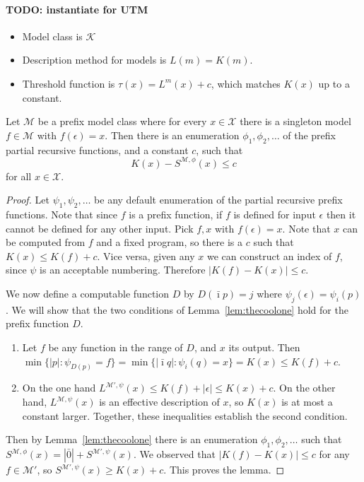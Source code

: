 \documentclass{style/llncs}
\newcommand{\M}{\mathcal M}
\newcommand{\K}{\mathcal K}
\newcommand{\X}{\mathcal X}
\begin{document}
\paragraph{TODO: instantiate for UTM}

\begin{itemize}
\item Model class is $\K$
\item Description method for models is $L(m)=K(m)$.
\item Threshold function is $\tau(x)=L^m(x)+c$, which matches $K(x)$
  up to a constant.
\end{itemize}


\begin{lemma}
Let $\M$ be a prefix model class where for every $x\in\X$ there is a singleton model $f\in\M$ with $f(\epsilon)=x$. Then there is an enumeration $\phi_1,\phi_2,\ldots$ of the prefix partial recursive functions, and a constant $c$, such that
\[
K(x)-S^{\M,\phi}(x)\le c
\]
for all $x\in\X$.
\end{lemma}
\begin{proof}
Let $\psi_1,\psi_2,\ldots$ be any default enumeration of the partial recursive prefix functions. Note that since $f$ is a prefix function, if $f$ is defined for input $\epsilon$ then it cannot be defined for any other input. Pick $f,x$ with $f(\epsilon)=x$. Note that $x$ can be computed from $f$ and a fixed program, so there is a $c$ such that $K(x)\le K(f)+c$. Vice versa, given any $x$ we can construct an index of $f$, since $\psi$ is an acceptable numbering. Therefore $|K(f)-K(x)|\le c$.

We now define a computable function $D$ by $D(\bar\imath p)=j$ where $\psi_j(\epsilon) = \psi_i(p)$.  We will show that the two conditions of Lemma~\ref{lem:thecoolone} hold for the prefix function $D$.

\begin{enumerate}
\item Let $f$ be any function in the range of $D$, and $x$ its output. Then $\min\{|p|:\psi_{D(p)}=f\}=\min\{|\bar\imath q|:\psi_i(q)=x\}=K(x)\le K(f)+c$.
\item On the one hand $L^{\M',\psi}(x)\le K(f)+|\epsilon|\le K(x)+c$. On the other hand, $L^{\M,\psi}(x)$ is an effective description of $x$, so $K(x)$ is at most a constant larger.
Together, these inequalities establish the second condition.
\end{enumerate}

Then by Lemma~\ref{lem:thecoolone} there is an enumeration $\phi_1,\phi_2,\ldots$ such that $S^{\M,\phi}(x)=|\bar 0|+S^{\M',\psi}(x)$. We observed that $|K(f)-K(x)|\le c$ for any $f\in\M'$, so $S^{\M',\psi}(x)\ge K(x)+c$. This proves the lemma.
\end{proof}
\end{document}
